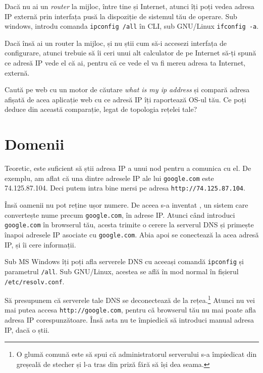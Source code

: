 
Dacă nu ai un \textsl{router} la mijloc, între tine și Internet, atunci îți poți vedea adresa IP
externă prin interfața pusă la dispoziție de sistemul tău de operare. Sub windows, introdu
comanda \texttt{ipconfig /all} în CLI, sub GNU/Linux \texttt{ifconfig -a}.

Dacă însă ai un router la mijloc, și nu știi cum să-i accesezi interfața de configurare,
atunci trebuie să îi ceri unui alt calculator de pe Internet să-ți spună ce adresă IP
vede el că ai, pentru că ce vede el va fi mereu adresa ta Internet, externă.

\begin{Exercise}[title={What is my IP Address?},difficulty=1]
Caută pe web cu un motor de căutare \textit{what is my ip address} și compară
adresa afișată de acea aplicație web cu ce adresă IP îți raportează OS-ul tău.
Ce poți deduce din această comparație, legat de topologia rețelei tale?
\end{Exercise}

\section{Domenii}
Teoretic, este suficient să știi adresa IP a unui nod pentru a comunica cu el. De exemplu,
am aflat că una dintre adresele IP ale lui \texttt{google.com} este 74.125.87.104. Deci putem
intra bine mersi pe adresa \texttt{http://74.125.87.104}.

Însă oamenii nu pot reține ușor numere. De aceea s-a inventat ,
un sistem care convertește nume precum \texttt{google.com}, în adrese IP. Atunci când introduci
\texttt{google.com} în browserul tău, acesta trimite o cerere la serverul DNS și primește
înapoi adresele IP asociate cu \texttt{google.com}. Abia apoi se conectează la acea adresă IP,
și îi cere informații.

Sub MS Windows îți poți afla serverele DNS cu aceeași comandă \texttt{ipconfig} și parametrul
\texttt{/all}. Sub GNU/Linux, acestea se află în mod normal în fișierul \texttt{/etc/resolv.conf}.

Să presupunem că serverele tale DNS se deconectează de la rețea.\footnote{O glumă
comună este să spui că administratorul serverului s-a împiedicat din greșeală de stecher
și l-a tras din priză fără să își dea seama.} Atunci nu vei mai putea accesa \texttt{http://google.com},
pentru că browserul tău nu mai poate afla adresa IP corespunzătoare. Însă asta nu te împiedică
să introduci manual adresa IP, dacă o știi.

